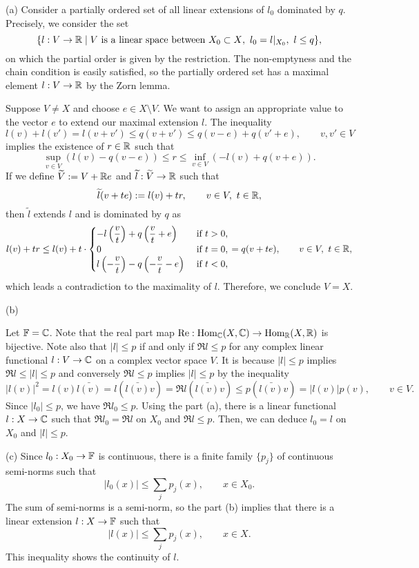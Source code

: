 \documentclass{../../large}
\begin{document}
\begin{pf}
(a)
Consider a partially ordered set of all linear extensions of $l_0$ dominated by $q$.
Precisely, we consider the set
\[\{l:V\to\mathbb{R}\mid\text{$V$ is a linear space between $X_0\subset X$},\ l_0=l|_{X_0},\ l\le q\},\]
on which the partial order is given by the restriction.
The non-emptyness and the chain condition is easily satisfied, so the partially ordered set has a maximal element $l:V\to\mathbb{R}$ by the Zorn lemma.

Suppose $V\ne X$ and choose $e\in X\setminus V$.
We want to assign an appropriate value to the vector $e$ to extend our maximal extension $l$.
The inequality
\[l(v)+l(v')=l(v+v')\le q(v+v')\le q(v-e)+q(v'+e),\qquad v,v'\in V\]
implies the existence of $r\in\mathbb{R}$ such that
\[\sup_{v\in V}(l(v)-q(v-e))\le r\le\inf_{v\in V}(-l(v)+q(v+e)).\]
If we define $\widetilde V:=V+\mathbb{R} e$ and $\widetilde l:\widetilde V\to\mathbb{R}$ such that
\[\tilde l(v+te):=l(v)+tr,\qquad v\in V,\ t\in\R,\]
then $\tilde l$ extends $l$ and is dominated by $q$ as
\[l(v)+tr\le l(v)+t\cdot
\begin{cases}
-l\left(\dfrac vt\right)+q\left(\dfrac vt+e\right)&\text{ if }t>0,\\
0&\text{ if }t=0,\\
l\left(-\dfrac vt\right)-q\left(-\dfrac vt-e\right)&\text{ if }t<0,
\end{cases}
=q(v+te),\qquad v\in V,\ t\in\mathbb{R},
\]
which leads a contradiction to the maximality of $l$.
Therefore, we conclude $V=X$.

(b)

Let $\mathbb{F}=\mathbb{C}$.
Note that the real part map $\operatorname{Re}:\operatorname{Hom}_{\mathbb{C}}(X,\mathbb{C})\to\operatorname{Hom}_{\mathbb{R}}(X,\mathbb{R})$ is bijective.
Note also that $|l|\le p$ if and only if $\Re l\le p$ for any complex linear functional $l:V\to\mathbb{C}$ on a complex vector space $V$.
It is because $|l|\le p$ implies $\Re l\le|l|\le p$ and conversely $\Re l\le p$ implies $|l|\le p$ by the inequality
\[|l(v)|^2=l(v)\bar{l(v)}=l(\bar{l(v)}v)=\Re l(\bar{l(v)}v)\le p(\bar{l(v)}v)=|l(v)|p(v),\qquad v\in V.\]
Since $|l_0|\le p$, we have $\Re l_0\le p$.
Using the part (a), there is a linear functional $l:X\to\mathbb{C}$ such that $\Re l_0=\Re l$ on $X_0$ and $\Re l\le p$.
Then, we can deduce $l_0=l$ on $X_0$ and $|l|\le p$.

(c)
Since $l_0:X_0\to\mathbb{F}$ is continuous, there is a finite family $\{p_j\}$ of continuous semi-norms such that
\[|l_0(x)|\le\sum_jp_j(x),\qquad x\in X_0.\]
The sum of semi-norms is a semi-norm, so the part (b) implies that there is a linear extension $l:X\to\mathbb{F}$ such that
\[|l(x)|\le\sum_jp_j(x),\qquad x\in X.\]
This inequality shows the continuity of $l$.

\end{pf}
\end{document}
